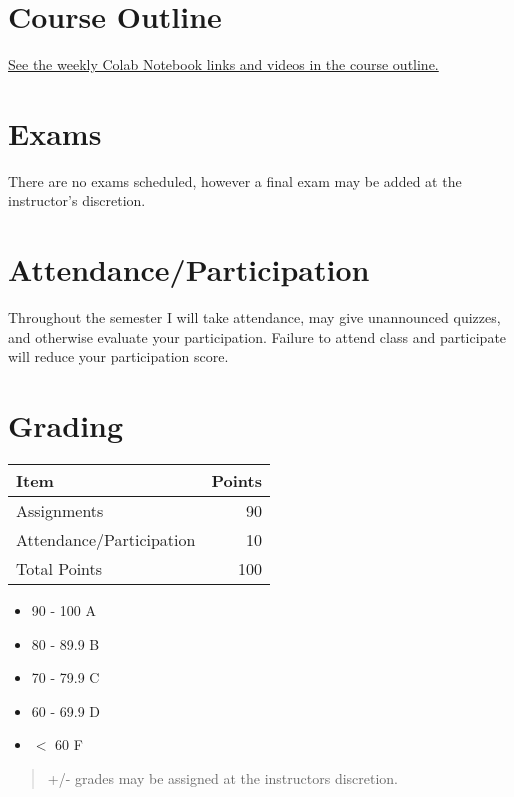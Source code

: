 \documentclass[11pt]{article}
\begin{document}
\section{Course Outline}
\label{sec:org2c103a2}

\href{https://financial-education.github.io/python\_for\_finance\_outline/}{See the weekly Colab Notebook links and videos in the course outline.}
\section{Exams}
\label{sec:org8c30616}

There are no exams scheduled, however a final exam may be added at the instructor's discretion. 
\section{Attendance/Participation}
\label{sec:orga0ddc9c}

Throughout the semester I will take attendance, may give unannounced quizzes, and otherwise evaluate your participation.  Failure to attend class and participate will reduce your participation score.
\section{Grading}
\label{sec:org64c6558}

\begin{center}


\begin{center}
\begin{tabular}{lr}
Item & Points\\
\hline
Assignments & 90\\
Attendance/Participation & 10\\
\hline
Total Points & 100\\
\hline
\end{tabular}
\end{center}
\end{center}

\begin{itemize}
\item 90 - 100 A
\item 80 - 89.9 B
\item 70 - 79.9 C
\item 60 - 69.9 D
\item \(<\) 60 F
\end{itemize}

\begin{quote}
+/- grades may be assigned at the instructors discretion.
\end{quote}
\end{document}
